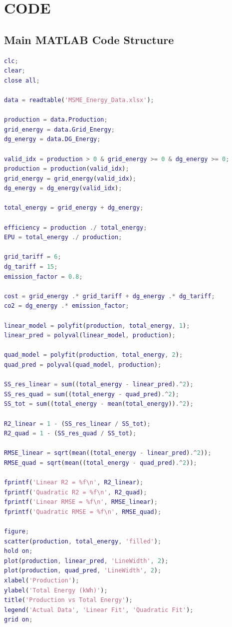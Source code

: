 \chapter{CODE}
\label{app:code}

\section{Main MATLAB Code Structure}
\begin{lstlisting}[language=Matlab]
clc;
clear;
close all;

data = readtable('MSME_Energy_Data.xlsx');

production = data.Production;
grid_energy = data.Grid_Energy;
dg_energy = data.DG_Energy;

valid_idx = production > 0 & grid_energy >= 0 & dg_energy >= 0;
production = production(valid_idx);
grid_energy = grid_energy(valid_idx);
dg_energy = dg_energy(valid_idx);

total_energy = grid_energy + dg_energy;

efficiency = production ./ total_energy;
EPU = total_energy ./ production;

grid_tariff = 6;
dg_tariff = 15;
emission_factor = 0.8;

cost = grid_energy .* grid_tariff + dg_energy .* dg_tariff;
co2 = dg_energy .* emission_factor;

linear_model = polyfit(production, total_energy, 1);
linear_pred = polyval(linear_model, production);

quad_model = polyfit(production, total_energy, 2);
quad_pred = polyval(quad_model, production);

SS_res_linear = sum((total_energy - linear_pred).^2);
SS_res_quad = sum((total_energy - quad_pred).^2);
SS_tot = sum((total_energy - mean(total_energy)).^2);

R2_linear = 1 - (SS_res_linear / SS_tot);
R2_quad = 1 - (SS_res_quad / SS_tot);

RMSE_linear = sqrt(mean((total_energy - linear_pred).^2));
RMSE_quad = sqrt(mean((total_energy - quad_pred).^2));

fprintf('Linear R2 = %f\n', R2_linear);
fprintf('Quadratic R2 = %f\n', R2_quad);
fprintf('Linear RMSE = %f\n', RMSE_linear);
fprintf('Quadratic RMSE = %f\n', RMSE_quad);

figure;
scatter(production, total_energy, 'filled');
hold on;
plot(production, linear_pred, 'LineWidth', 2);
plot(production, quad_pred, 'LineWidth', 2);
xlabel('Production');
ylabel('Total Energy (kWh)');
title('Production vs Total Energy');
legend('Actual Data', 'Linear Fit', 'Quadratic Fit');
grid on;
\end{lstlisting}

